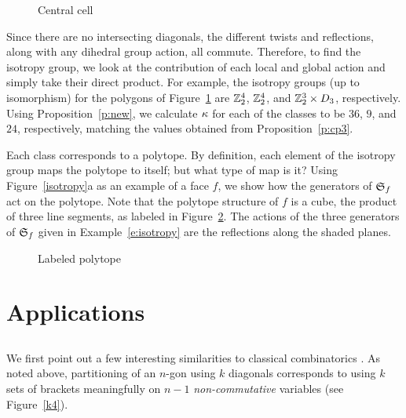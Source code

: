 \documentclass[10pt]{amsart}
\begin{document}
\begin{figure}[h]
\caption{Central cell}
\label{centercell}
\end{figure}

Since there are no intersecting diagonals, the different twists and reflections, along with any dihedral group action, all commute. Therefore, to find the isotropy group, we look at the  contribution of each local and global action and simply take their direct product.  For example, the isotropy groups (up to isomorphism) for the polygons of Figure~\ref{centercell} are ${\mathbb Z}_2^4$, ${\mathbb Z}_2^4$, and ${\mathbb Z}_2^3 \times D_3$, respectively.  Using Proposition~\ref{p:new}, we calculate $\kappa$ for each of the classes to be $36$, $9$, and $24$, respectively, matching the values obtained from Proposition~\ref{p:cp3}.
 
\begin{rem}
Each class corresponds to a polytope. By definition, each element of the isotropy group maps the polytope to itself; but what type of map is it? Using Figure~\ref{isotropy}a as an example of a face $f$, we show how the generators of ${\mathfrak S}_f$ act on the polytope.  Note that the polytope structure of $f$ is a cube, the product of three line segments, as labeled in Figure~\ref{isocube}. The actions of the three generators of ${\mathfrak S}_f$ given in Example~\ref{e:isotropy} are the reflections along the shaded planes.
\end{rem}

\begin{figure}[h]
\caption{Labeled polytope}
\label{isocube}
\end{figure}

%
%

\section {Applications}

\subsection{}
We first point out a few interesting similarities to classical combinatorics \cite[\S1.15]{comtet}.  As noted above, partitioning of an $n$-gon using $k$ diagonals corresponds to using $k$ sets of brackets meaningfully on $n-1$ {\em non-commutative} variables (see Figure~\ref{k4}). 
 
\end{document}
